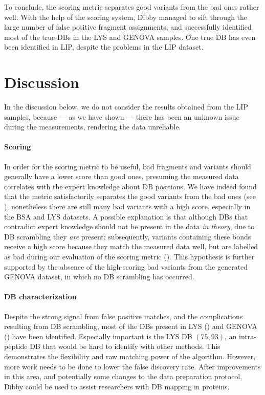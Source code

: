 To conclude, the scoring metric separates good variants from the bad ones rather well. With the help of the scoring system, Dibby managed to sift through the large number of false positive fragment assignments, and successfully identified most of the true DBs in the LYS and GENOVA samples. One true DB has even been identified in LIP, despite the problems in the LIP dataset.


\section{Discussion}

In the discussion below, we do not consider the results obtained from the LIP samples, because --- as we have shown --- there has been an unknown issue during the measurements, rendering the data unreliable.

\paragraph{Scoring} In order for the scoring metric to be useful, bad fragments and variants should generally have a lower score than good ones, presuming the measured data correlates with the expert knowledge about DB positions. We have indeed found that the metric satisfactorily separates the good variants from the bad ones (see ), nonetheless there are still many bad variants with a high score, especially in the BSA and LYS datasets. A possible explanation is that although DBs that contradict expert knowledge should not be present in the data \emph{in theory}, due to DB scrambling they \emph{are} present; subsequently, variants containing these bonds receive a high score because they match the measured data well, but are labelled as bad during our evaluation of the scoring metric (). This hypothesis is further supported by the absence of the high-scoring bad variants from the generated GENOVA dataset, in which no DB scrambling has occurred.

\paragraph{DB characterization} Despite the strong signal from false positive matches, and the complications resulting from DB scrambling, most of the DBs present in LYS () and GENOVA () have been identified. Especially important is the LYS DB \((75, 93)\), an intra-peptide DB that would be hard to identify with other methods. This demonstrates the flexibility and raw matching power of the algorithm. However, more work needs to be done to lower the false discovery rate. After improvements in this area, and potentially some changes to the data preparation protocol, Dibby could be used to assist researchers with DB mapping in proteins.

